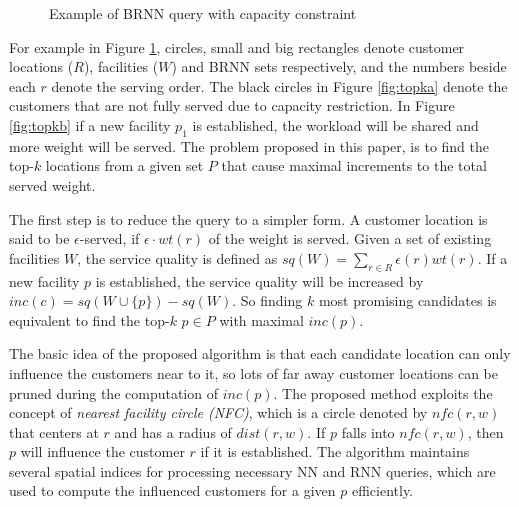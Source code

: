 \documentclass[paper=a4, fontsize=18pt]{article} %
\numberwithin{equation}{section} %
\numberwithin{figure}{section} %
\numberwithin{table}{section} %
\begin{document}
\begin{figure}[h]
  \centering
  \caption{Example of BRNN query with capacity constraint}\label{fig:topk}
\end{figure}

For example in Figure \ref{fig:topk}, circles, small and big rectangles denote customer locations ($R$), facilities ($W$) and BRNN sets respectively, and the numbers beside each $r$ denote the serving order. The black circles in Figure \ref{fig:topka} denote the customers that are not fully served due to capacity restriction. In Figure \ref{fig:topkb} if a new facility $p_1$ is established, the workload will be shared and more weight will be served. The problem proposed in this paper, is to find the top-$k$ locations from a given set $P$ that cause maximal increments to the total served weight.

The first step is to reduce the query to a simpler form. A customer location is said to be $\epsilon$-served, if $\epsilon \cdot wt(r)$ of the weight is served. Given a set of existing facilities $W$, the service quality is defined as $sq(W) = \sum_{r\in R} \epsilon(r) wt(r)$. If a new facility $p$ is established, the service quality will be increased by $inc(c) = sq(W \cup \{p\}) - sq(W)$. So finding $k$ most promising candidates is equivalent to find the top-$k$ $p \in P$ with maximal $inc(p)$.

The basic idea of the proposed algorithm is that each candidate location can only influence the customers near to it, so lots of far away customer locations can be pruned during the computation of $inc(p)$. The proposed method exploits the concept of \emph{nearest facility circle (NFC)}, which is a circle denoted by $nfc(r,w)$ that centers at $r$ and has a radius of $dist(r,w)$. If $p$ falls into $nfc(r,w)$, then $p$ will influence the customer $r$ if it is established. The algorithm maintains several spatial indices for processing necessary NN and RNN queries, which are used to compute the influenced customers for a given $p$ efficiently.
\end{document}
